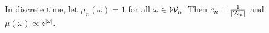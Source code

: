 In discrete time, let $\mu_n(\omega) = 1$ for all $\omega\in\mathcal{W}_n$.
Then $c_n = \frac{1}{|\mathcal{W}_n|}$ and $\mu(\omega) \propto z^{|\omega|}$.




